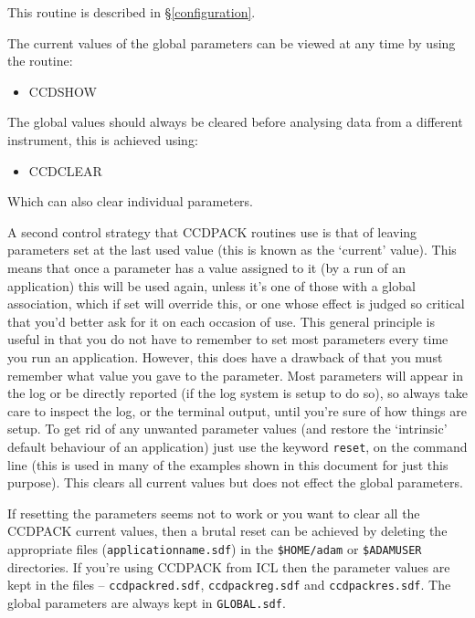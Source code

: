 \documentclass[twoside,11pt]{article}
\newcommand{\hyperref}[4]{#2\ref{#4}#3}
\newcommand{\htmlref}[2]{#1}
\renewcommand{\_}{\texttt{\symbol{95}}}
\newcommand{\text}[1]{{\small \tt #1}}
\newcommand{\xroutine}[1]{\htmlref{{\sc #1}}{#1}}
\begin{document}
This routine is described \hyperref{elsewhere}{in \S}{}{configuration}.

The current values of the global parameters can be viewed at any time by
using the routine:
\begin{itemize}
\item \xroutine{CCDSHOW}
\end{itemize}

The global values should always be cleared before analysing data from a
different instrument, this is achieved using:
\begin{itemize}
\item \xroutine{CCDCLEAR}
\end{itemize}

Which can also clear individual parameters.

A second control strategy that CCDPACK routines use is that of leaving
parameters set at the last used value (this is known as the `current'
value).
This means that once a parameter has a value assigned to it (by a run
of an application) this will be used again, unless it's one of those
with a global association, which if set will override this, or one
whose effect is judged so critical that you'd better ask for it on
each occasion of use.
This general principle is useful in that you do not have to remember
to set most parameters every time you run an application.
However, this does have a drawback of that you must remember what
value you gave to the parameter.
Most parameters will appear in the log or be directly reported (if
the log system is setup to do so), so always take care to inspect
the log, or the terminal output, until you're sure of how things
are setup.
To get rid of any unwanted parameter values (and restore the
`intrinsic' default behaviour of an application) just use the keyword
\text{reset}, on the command line (this is used in many of the
examples shown in this document for just this purpose).
This clears all current values but does not effect the global
parameters.

If resetting the parameters seems not to work or you want to clear all
the CCDPACK current values, then a brutal reset can be achieved
by deleting the appropriate files (\text{application\_name.sdf}) in the
\text{\$HOME/adam} or \text{\$ADAM\_USER} directories. If you're using
CCDPACK from ICL then the parameter values are kept in the
files -- \text{ccdpack\_red.sdf}, \text{ccdpack\_reg.sdf} and
\text{ccdpack\_res.sdf}. The global parameters are always kept in
\text{GLOBAL.sdf}.
\end{document}
